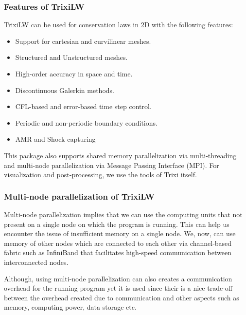 \documentclass[12pt]{article}
\begin{document}
\subsubsection{Features of {\ttfamily TrixiLW}}
{\ttfamily TrixiLW} can be used for conservation laws in $2$D with the following features:
\begin{itemize}
    \item Support for cartesian and curvilinear meshes.
    \item Structured and Unstructured meshes.
    \item High-order accuracy in space and time.
    \item Discontinuous Galerkin methods.
    \item CFL-based and error-based time step control.
    \item Periodic and non-periodic boundary conditions.
    \item AMR and Shock capturing
\end{itemize}
This package also supports {\ttfamily shared memory} parallelization via {\ttfamily multi-threading} and {\ttfamily multi-node} parallelization via {\ttfamily Message Passing
Interface (MPI)}. For visualization and post-processing, we use the tools of {\ttfamily Trixi} itself.

\subsubsection{{\ttfamily Multi-node} parallelization of {\ttfamily TrixiLW}}
{\ttfamily Multi-node} parallelization implies that we can use the computing units that not present on a single node on which the program is running. This can help us encounter
the issue of insufficient memory on a single node. We, now, can use memory of other nodes which are connected to each other via channel-based fabric such as {\ttfamily InfiniBand}
that facilitates high-speed communication between interconnected nodes. 

Although, using {\ttfamily multi-node} parallelization can also creates a communication overhead for the running program yet it is used since their is a nice trade-off between
the overhead created due to communication and other aspects such as memory, computing power, data storage etc. 
\end{document}
